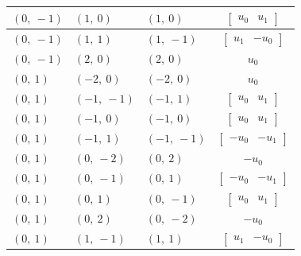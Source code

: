 \documentclass[11pt]{article}
\theoremstyle{definition}
\begin{document}
\begin{longtable}{|l|l|l|c|}
    \hline
    $\left( 0, \  -1\right)$ & $\left( 1, \  0\right)$ & $\left( 1, \  0\right)$ & $\left[\begin{matrix}u_{0} & u_{1}\end{matrix}\right]$ \\
    \hline
    $\left( 0, \  -1\right)$ & $\left( 1, \  1\right)$ & $\left( 1, \  -1\right)$ & $\left[\begin{matrix}u_{1} & - u_{0}\end{matrix}\right]$ \\
    \hline
    $\left( 0, \  -1\right)$ & $\left( 2, \  0\right)$ & $\left( 2, \  0\right)$ & $u_{0}$ \\
    \hline
    $\left( 0, \  1\right)$ & $\left( -2, \  0\right)$ & $\left( -2, \  0\right)$ & $u_{0}$ \\
    \hline
    $\left( 0, \  1\right)$ & $\left( -1, \  -1\right)$ & $\left( -1, \  1\right)$ & $\left[\begin{matrix}u_{0} & u_{1}\end{matrix}\right]$ \\
    \hline
    $\left( 0, \  1\right)$ & $\left( -1, \  0\right)$ & $\left( -1, \  0\right)$ & $\left[\begin{matrix}u_{0} & u_{1}\end{matrix}\right]$ \\
    \hline
    $\left( 0, \  1\right)$ & $\left( -1, \  1\right)$ & $\left( -1, \  -1\right)$ & $\left[\begin{matrix}- u_{0} & - u_{1}\end{matrix}\right]$ \\
    \hline
    $\left( 0, \  1\right)$ & $\left( 0, \  -2\right)$ & $\left( 0, \  2\right)$ & $- u_{0}$ \\
    \hline
    $\left( 0, \  1\right)$ & $\left( 0, \  -1\right)$ & $\left( 0, \  1\right)$ & $\left[\begin{matrix}- u_{0} & - u_{1}\end{matrix}\right]$ \\
    \hline
    $\left( 0, \  1\right)$ & $\left( 0, \  1\right)$ & $\left( 0, \  -1\right)$ & $\left[\begin{matrix}u_{0} & u_{1}\end{matrix}\right]$ \\
    \hline
    $\left( 0, \  1\right)$ & $\left( 0, \  2\right)$ & $\left( 0, \  -2\right)$ & $- u_{0}$ \\
    \hline
    $\left( 0, \  1\right)$ & $\left( 1, \  -1\right)$ & $\left( 1, \  1\right)$ & $\left[\begin{matrix}u_{1} & - u_{0}\end{matrix}\right]$ \\

\end{longtable}
\end{document}
